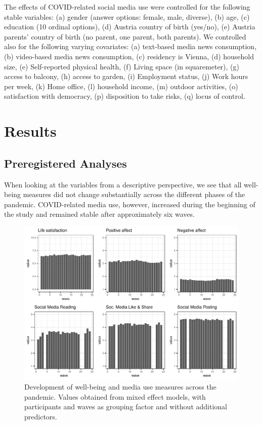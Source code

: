 \documentclass[
  english,
  man,floatsintext]{apa6}
\begin{document}
The effects of COVID-related social media use were controlled for the following stable variables:
(a) gender (answer options: female, male, diverse), (b) age, (c) education (10 ordinal options), (d) Austria country of birth (yes/no), (e) Austria parents' country of birth (no parent, one parent, both parents).
We controlled also for the following varying covariates:
(a) text-based media news consumption, (b) video-based media news consumption, (c) residency is Vienna, (d) household size, (e) Self-reported physical health, (f) Living space (in squaremeter), (g) access to balcony, (h) access to garden, (i) Employment status, (j) Work hours per week, (k) Home office, (l) household income, (m) outdoor activities, (o) satisfaction with democracy, (p) disposition to take risks, (q) locus of control.

\hypertarget{results}{%
\section{Results}\label{results}}

\hypertarget{preregistered-analyses}{%
\subsection{Preregistered Analyses}\label{preregistered-analyses}}

When looking at the variables from a descriptive perspective, we see that all well-being measures did not change substantially across the different phases of the pandemic.
COVID-related media use, however, increased during the beginning of the study and remained stable after approximately six waves.

\begin{figure}[!h]
\includegraphics[width=\textwidth]{figures/fig_descriptives} \caption{Development of well-being and media use measures across the pandemic. Values obtained from mixed effect models, with participants and waves as grouping factor and without additional predictors.}\label{fig:fig-desc}
\end{figure}
\end{document}
